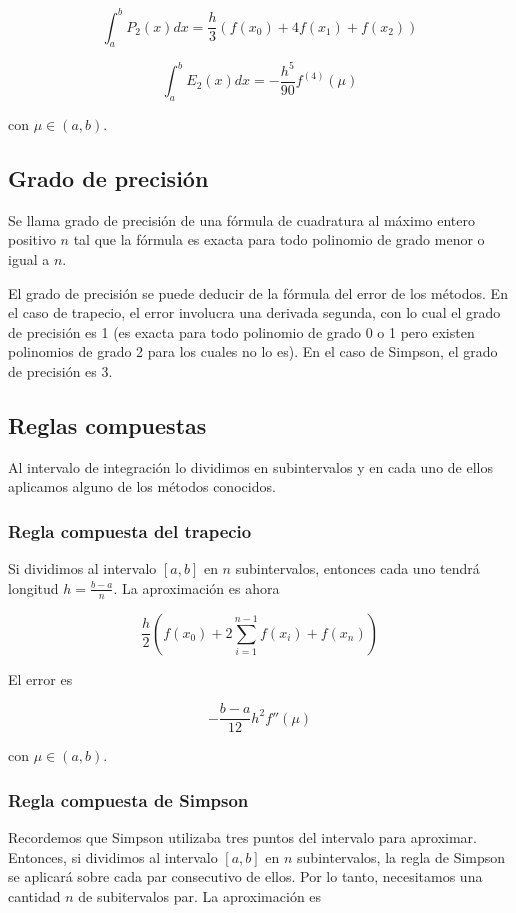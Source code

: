 \[\int_{a}^b P_2(x) dx = \frac{h}{3}(f(x_0) + 4f(x_1) + f(x_2))\]

\[\int_{a}^b E_2(x) dx = -\frac{h^5}{90} f^{(4)}(\mu)\]

con $\mu \in (a, b)$.

\subsection{Grado de precisión}

\begin{defi}
Se llama grado de precisión de una fórmula de cuadratura al máximo entero positivo $n$ tal que la fórmula es exacta para todo polinomio de grado menor o igual a $n$.
\end{defi}

El grado de precisión se puede deducir de la fórmula del error de los métodos. En el caso de trapecio, el error involucra una derivada segunda, con lo cual el grado de precisión es 1 (es exacta para todo polinomio de grado 0 o 1 pero existen polinomios de grado 2 para los cuales no lo es). En el caso de Simpson, el grado de precisión es 3.

\subsection{Reglas compuestas}
Al intervalo de integración lo dividimos en subintervalos y en cada uno de ellos aplicamos alguno de los métodos conocidos.

\subsubsection{Regla compuesta del trapecio}

Si dividimos al intervalo $[a, b]$ en $n$ subintervalos, entonces cada uno tendrá longitud $h = \frac{b - a}{n}$. La aproximación es ahora

\[\frac{h}{2}\left(f(x_0) + 2 \sum_{i = 1}^{n - 1} f(x_i) + f(x_n)\right)\]

El error es

\[-\frac{b - a}{12}h^2 f''(\mu)\]

con $\mu \in (a, b)$.

\subsubsection{Regla compuesta de Simpson}

Recordemos que Simpson utilizaba tres puntos del intervalo para aproximar. Entonces, si dividimos al intervalo $[a, b]$ en $n$ subintervalos, la regla de Simpson se aplicará sobre cada par consecutivo de ellos. Por lo tanto, necesitamos una cantidad $n$ de subitervalos par. La aproximación es


